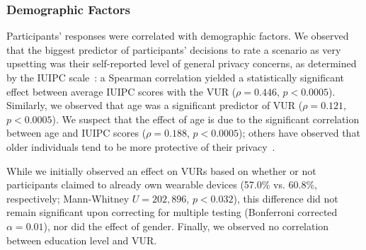 \subsubsection{Demographic Factors}

Participants' responses were correlated with demographic factors. We observed that the biggest predictor of participants' decisions to rate a scenario as very upsetting was their self-reported level of general privacy concerns, as determined by the IUIPC scale~\cite{malhotra2004internet}: a Spearman correlation yielded a statistically significant effect between average IUIPC scores with the VUR ($\rho=0.446$, $p<0.0005$). Similarly, we observed that age was a significant predictor of VUR ($\rho=0.121$, $p<0.0005$). We suspect that the effect of age is due to the significant correlation between age and IUIPC scores ($\rho=0.188$, $p<0.0005$); others have observed that older individuals tend to be more protective of their privacy~\cite{varian2005demographics}.



While we initially observed an effect on VURs based on whether or not participants claimed to already own wearable devices (57.0\% vs. 60.8\%, respectively; Mann-Whitney $U=202,896$, $p<0.032$), this difference did not remain significant upon correcting for multiple testing (Bonferroni corrected $\alpha=0.01$), nor did the effect of gender. Finally, we observed no correlation between education level and VUR.